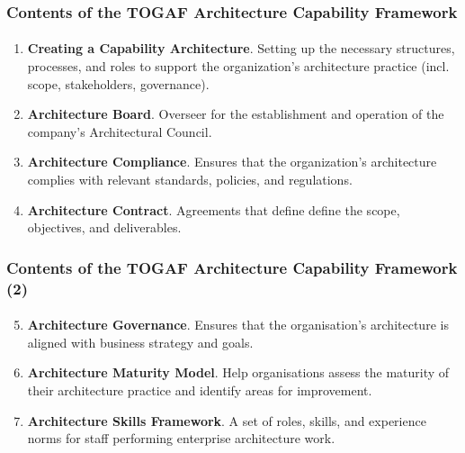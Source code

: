 \documentclass[aspectratio=169, table]{beamer}
\begin{document}
    \begin{frame}
        \frametitle{Contents of the TOGAF Architecture Capability Framework}
        \framesubtitle{\hspace{1cm}}
        \begin{enumerate}
            \item \textbf{Creating a Capability Architecture}. Setting up the necessary structures, processes, and roles to support the organization’s architecture practice (incl. scope, stakeholders, governance).
            \item \textbf{Architecture Board}. Overseer for the establishment and operation of the company's Architectural Council.
            \item \textbf{Architecture Compliance}.  Ensures that the organization’s architecture complies with relevant standards, policies, and regulations.
            \item \textbf{Architecture Contract}. Agreements that define define the scope, objectives, and deliverables.
        \end{enumerate}
    \end{frame}

    \begin{frame}
        \frametitle{Contents of the TOGAF Architecture Capability Framework (2)}
        \framesubtitle{\hspace{1cm}}
        \begin{enumerate}
            \setcounter{enumi}{4}
            \item \textbf{Architecture Governance}.  Ensures that the organisation’s architecture is aligned with business strategy and goals.
            \item \textbf{Architecture Maturity Model}. Help organisations assess the maturity of their architecture practice and identify areas for improvement.
            \item \textbf{Architecture Skills Framework}. A set of roles, skills, and experience norms for staff performing enterprise architecture work.
        \end{enumerate}
    \end{frame}
\end{document}
